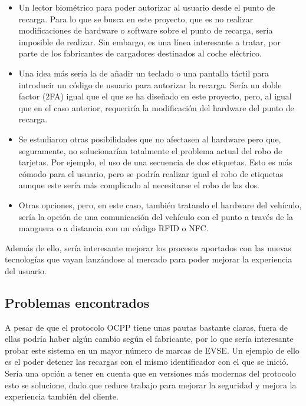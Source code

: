 \documentclass[12pt,a4paper,onecolumn,oneside]{report}
\begin{document}
\begin{itemize}
\item Un lector biométrico para poder autorizar al usuario desde el punto de recarga. Para lo que se busca en este proyecto, que es no realizar modificaciones de hardware o software sobre el punto de recarga, sería imposible de realizar. Sin embargo, es una línea interesante a tratar, por parte de los fabricantes de cargadores destinados al coche eléctrico.

\item Una idea más sería la de añadir un teclado o una pantalla táctil para introducir un código de usuario para autorizar la recarga. Sería un doble factor (2FA) igual que el que se ha diseñado en este proyecto, pero, al igual que en el caso anterior, requeriría la modificación del hardware del punto de recarga.

\item Se estudiaron otras posibilidades que no afectasen al hardware pero que, seguramente, no solucionarían totalmente el problema actual del robo de tarjetas. Por ejemplo, el uso de una secuencia de dos etiquetas. Esto es más cómodo para el usuario, pero se podría realizar igual el robo de etiquetas aunque este sería más complicado al necesitarse el robo de las dos.

\item Otras opciones, pero, en este caso, también tratando el hardware del vehículo, sería la opción de una comunicación del vehículo con el punto a través de la manguera o a distancia con un código RFID o NFC.

\end{itemize}

Además de ello, sería interesante mejorar los procesos aportados con las nuevas tecnologías que vayan lanzándose al mercado para poder mejorar la experiencia del usuario.


\subsection*{Problemas encontrados}

A pesar de que el protocolo OCPP tiene unas pautas bastante claras, fuera de ellas podría haber algún cambio según el fabricante, por lo que sería interesante probar este sistema en un mayor número de marcas de EVSE. Un ejemplo de ello es el poder detener las recargas con el mismo identificador con el que se inició. Sería una opción a tener en cuenta que en versiones más modernas del protocolo esto se solucione, dado que reduce trabajo para mejorar la seguridad y mejora la experiencia también del cliente.
\end{document}
